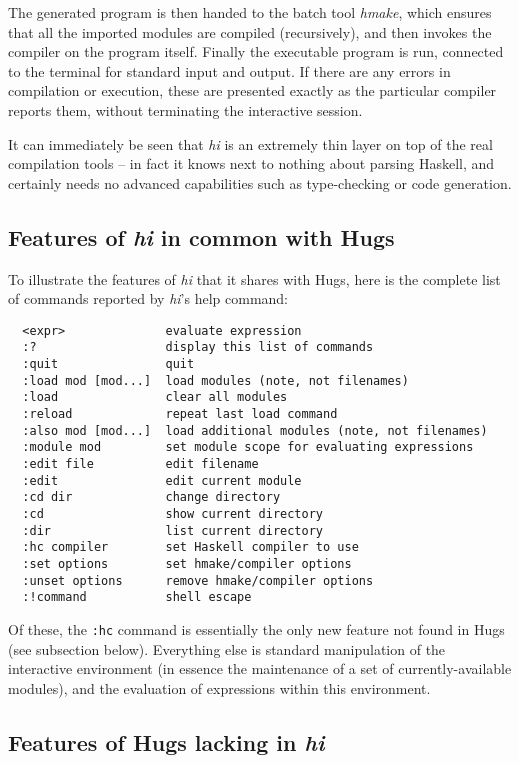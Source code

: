 \documentclass[a4paper]{llncs}
\begin{document}
The generated program is then handed to the batch tool {\em hmake},
which ensures that all the imported modules are compiled (recursively),
and then invokes the compiler on the program itself.  Finally the
executable program is run, connected to the terminal for standard
input and output.  If there are any errors in compilation or execution,
these are presented exactly as the particular compiler reports them,
without terminating the interactive session.

It can immediately be seen that {\em hi} is an extremely thin layer on
top of the real compilation tools -- in fact it knows next to nothing
about parsing Haskell, and certainly needs no advanced capabilities
such as type-checking or code generation.

\subsection{Features of {\em hi} in common with Hugs}

To illustrate the features of {\em hi} that it shares with Hugs, here
is the complete list of commands reported by {\em hi}'s help command:

\begin{verbatim}
  <expr>              evaluate expression
  :?                  display this list of commands
  :quit               quit
  :load mod [mod...]  load modules (note, not filenames)
  :load               clear all modules
  :reload             repeat last load command
  :also mod [mod...]  load additional modules (note, not filenames)
  :module mod         set module scope for evaluating expressions
  :edit file          edit filename
  :edit               edit current module
  :cd dir             change directory
  :cd                 show current directory
  :dir                list current directory
  :hc compiler        set Haskell compiler to use
  :set options        set hmake/compiler options
  :unset options      remove hmake/compiler options
  :!command           shell escape
\end{verbatim}

Of these, the {\tt :hc} command is essentially the only new feature
not found in Hugs (see subsection below).  Everything else is
standard manipulation of the interactive environment (in essence
the maintenance of a set of currently-available modules), and the
evaluation of expressions within this environment.


\subsection{Features of Hugs lacking in {\em hi}}
\end{document}

